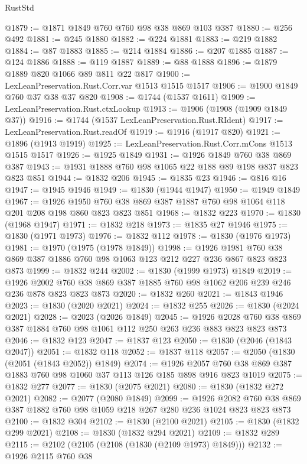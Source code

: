 \begin{lexlean}{RustStd}
\begin{coremodule}
@1879 := @1871 @1849 @760 @760 @98 @38 @869 @103 @387
@1880 := @256 @492
@1881 := @245 @1880
@1882 := @224 @1881
@1883 := @219 @1882
@1884 := @87 @1883
@1885 := @214 @1884
@1886 := @207 @1885
@1887 := @124 @1886
@1888 := @119 @1887
@1889 := @88 @1888
@1896 := @1879 @1889 @820 @1066 @89 @811 @22 @817
@1900 := LexLeanPreservation.Rust.Corr.var @1513 @1515 @1517
@1906 := @1900 @1849 @760 @37 @38 @37 @820
@1908 := @1744 (@1537 @1611)
@1909 := LexLeanPreservation.Rust.ctxLookup
@1913 := @1906 (@1908 (@1909 @1849 @37))
@1916 := @1744 (@1537 LexLeanPreservation.Rust.RIdent)
@1917 := LexLeanPreservation.Rust.readOf
@1919 := @1916 (@1917 @820)
@1921 := @1896 (@1913 @1919)
@1925 := LexLeanPreservation.Rust.Corr.mCons @1513 @1515 @1517
@1926 := @1925 @1849
@1931 := @1926 @1849 @760 @38 @869 @387
@1943 := @1931 @1888 @760 @98 @1065 @22 @188 @89 @198 @837 @823 @823 @851
@1944 := @1832 @206
@1945 := @1835 @23
@1946 := @816 @16
@1947 := @1945 @1946
@1949 := @1830 (@1944 @1947)
@1950 := @1949 @1849
@1967 := @1926 @1950 @760 @38 @869 @387 @1887 @760 @98 @1064 @118 @201 @208 @198 @860 @823 @823 @851
@1968 := @1832 @223
@1970 := @1830 (@1968 @1947)
@1971 := @1832 @218
@1973 := @1835 @27 @1946
@1975 := @1830 (@1971 @1973)
@1976 := @1832 @112
@1978 := @1830 (@1976 @1973)
@1981 := @1970 (@1975 (@1978 @1849))
@1998 := @1926 @1981 @760 @38 @869 @387 @1886 @760 @98 @1063 @123 @212 @227 @236 @867 @823 @823 @873
@1999 := @1832 @244
@2002 := @1830 (@1999 @1973) @1849
@2019 := @1926 @2002 @760 @38 @869 @387 @1885 @760 @98 @1062 @206 @239 @246 @236 @878 @823 @823 @873
@2020 := @1832 @260
@2021 := @1843 @1946
@2023 := @1830 (@2020 @2021)
@2024 := @1832 @255
@2026 := @1830 (@2024 @2021)
@2028 := @2023 (@2026 @1849)
@2045 := @1926 @2028 @760 @38 @869 @387 @1884 @760 @98 @1061 @112 @250 @263 @236 @883 @823 @823 @873
@2046 := @1832 @123
@2047 := @1837 @123
@2050 := @1830 (@2046 (@1843 @2047))
@2051 := @1832 @118
@2052 := @1837 @118
@2057 := @2050 (@1830 (@2051 (@1843 @2052)) @1849)
@2074 := @1926 @2057 @760 @38 @869 @387 @1883 @760 @98 @1060 @37 @113 @126 @185 @898 @916 @823 @1019
@2075 := @1832 @277
@2077 := @1830 (@2075 @2021)
@2080 := @1830 (@1832 @272 @2021)
@2082 := @2077 (@2080 @1849)
@2099 := @1926
    @2082
    @760
    @38
    @869
    @387
    @1882
    @760
    @98
    @1059
    @218
    @267
    @280
    @236
    @1024
    @823
    @823
    @873
@2100 := @1832 @304
@2102 := @1830 (@2100 @2021)
@2105 := @1830 (@1832 @299 @2021)
@2108 := @1830 (@1832 @294 @2021)
@2109 := @1832 @289
@2115 := @2102 (@2105 (@2108 (@1830 (@2109 @1973) @1849)))
@2132 := @1926
    @2115
    @760
    @38

\end{coremodule}
\end{lexlean}
